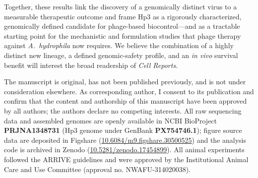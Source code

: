 \documentclass[11pt,a4paper]{article}
\begin{document}
Together, these results link the discovery of a genomically distinct virus to a
measurable therapeutic outcome and frame Hp3 as a rigorously characterized,
genomically defined candidate for phage-based biocontrol---and as a tractable
starting point for the mechanistic and formulation studies that phage therapy
against \emph{A.~hydrophila} now requires. We believe the combination of a
highly distinct new lineage, a defined genomic-safety profile, and an
\emph{in vivo} survival benefit will interest the broad readership of
\emph{Cell Reports}.

The manuscript is original, has not been published previously, and is not under
consideration elsewhere. As corresponding author, I consent to its publication
and confirm that the content and authorship of this manuscript have been
approved by all authors; the authors declare no competing interests. All raw
sequencing data and assembled genomes are openly available in NCBI BioProject
\textbf{PRJNA1348731} (Hp3 genome under GenBank \textbf{PX754746.1}); figure
source data are deposited in Figshare
(\href{https://doi.org/10.6084/m9.figshare.30500525}{10.6084/m9.figshare.30500525})
and the analysis code is archived in Zenodo
(\href{https://doi.org/10.5281/zenodo.17454899}{10.5281/zenodo.17454899}).
All animal experiments followed the ARRIVE guidelines and were approved by the
Institutional Animal Care and Use Committee (approval no. NWAFU-314020038).
\end{document}
